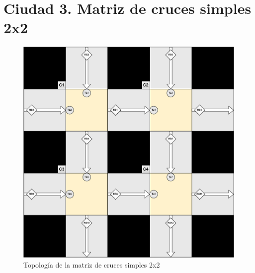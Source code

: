 \section{Ciudad 3. Matriz de cruces simples 2x2}
\begin{figure}[H]
    \centering
    \includegraphics[width=1\linewidth]{text/image/DCruc-CSimple2x2-Topologia.pdf}
    \caption{Topología de la matriz de cruces simples 2x2}
    \label{fig:cruce_simple2x2_topologia}
\end{figure}

\newpage
